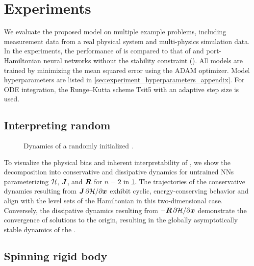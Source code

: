 \section{Experiments}\label{sec:experiments}

We evaluate the proposed model on multiple example problems, including measurement data from a real physical system and multi-physics simulation data.
In the experiments, the performance of \sPHNNs is compared to that of \NODEs and port-Hamiltonian neural networks without the stability constraint (\PHNNs). 
All models are trained by minimizing the mean squared error using the ADAM \cite{kingma2015} optimizer. 
Model hyperparameters are listed in \cref{sec:experiment_hyperparameters_appendix}.
For \gls{ODE} integration, the Runge--Kutta scheme Tsit5 \cite{tsitouras2011} with an adaptive step size is used. 
\subsection[Interpreting random sPHNNs]{Interpreting random \sPHNNs}

\begin{figure}[ht]
    \centering
    \vspace*{-2mm}
    \caption{Dynamics of a randomly initialized \sPHNN.}
    \label{fig:random_network}
\end{figure}

To visualize the physical bias and inherent interpretability of \sPHNNs, we show the decomposition into conservative and dissipative dynamics for untrained \glspl{NN} parameterizing ${\mathcal{H}}$, $\boldsymbol{J}$, and $\boldsymbol{R}$ for $n=2$ in \cref{fig:random_network}.
The trajectories of the conservative dynamics resulting from $\boldsymbol{J}\,\partial{\mathcal{H}}/\partial\boldsymbol{x}$ exhibit cyclic, energy-conserving behavior and align with the level sets of the Hamiltonian in this two-dimensional case.
Conversely, the dissipative dynamics resulting from $-\boldsymbol{R}\,\partial{\mathcal{H}}/\partial\boldsymbol{x}$ demonstrate the convergence of solutions to the origin, resulting in the globally asymptotically stable dynamics of the \sPHNN.

\subsection{Spinning rigid body}\label{sec:spinning_rigid_body}

